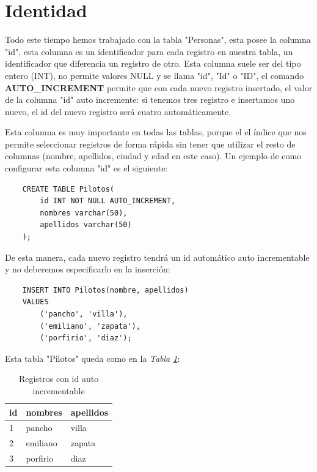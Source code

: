 \section{Identidad}

Todo este tiempo hemos trabajado con la tabla "Personas", esta posee la columna "id", esta columna es un identificador para cada registro en nuestra tabla, un identificador que diferencia un registro de otro. Esta columna suele ser del tipo entero (INT), no permite valores NULL y se llama "id", "Id" o "ID", el comando \textbf{AUTO\_INCREMENT} permite que con cada nuevo registro insertado, el valor de la columna "id" auto incremente: si tenemos tres registro e insertamos uno nuevo, el id del nuevo registro será cuatro automáticamente.

Esta columna es muy importante en todas las tablas, porque el el índice que nos permite seleccionar registros de forma rápida sin tener que utilizar el resto de columnas (nombre, apellidos, ciudad y edad en este caso). Un ejemplo de como configurar esta columna "id" es el siguiente:
\begin{lstlisting}
    CREATE TABLE Pilotos(
        id INT NOT NULL AUTO_INCREMENT,
        nombres varchar(50),
        apellidos varchar(50)
    );
\end{lstlisting}

De esta manera, cada nuevo registro tendrá un id automático auto incrementable y no deberemos especificarlo en la inserción:
\begin{lstlisting}
    INSERT INTO Pilotos(nombre, apellidos)
    VALUES
        ('pancho', 'villa'),
        ('emiliano', 'zapata'),
        ('porfirio', 'diaz');
\end{lstlisting}

Esta tabla "Pilotos" queda como en la \textit{Tabla \ref{tab: 31}}:
\begin{table}[H]
    \centering
    \caption{Registros con id auto incrementable}
    \label{tab: 31}
    \begin{tabular}{|l|l|l|}
        \hline
        \textbf{id} & \textbf{nombres} & \textbf{apellidos} \\
        \hline
        1 & pancho      & villa \\
        \hline
        2 & emiliano    & zapata \\
        \hline
        3 & porfirio    & diaz \\
        \hline
    \end{tabular}
\end{table}

